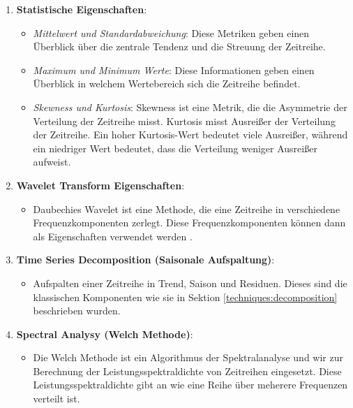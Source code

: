 \begin{enumerate}
    \item \textbf{Statistische Eigenschaften}:
    \begin{itemize}
        \item \textit{Mittelwert und Standardabweichung}: Diese Metriken geben einen Überblick über die zentrale Tendenz und die Streuung der Zeitreihe.
        \item \textit{Maximum und Minimum Werte}: Diese Informationen geben einen Überblick in welchem Wertebereich sich die Zeitreihe befindet.
        \item \textit{Skewness und Kurtosis}: Skewness ist eine Metrik, die die Asymmetrie der Verteilung der Zeitreihe misst. Kurtosis misst Ausreißer der Verteilung der Zeitreihe. 
        Ein hoher Kurtosis-Wert bedeutet viele Ausreißer, während ein niedriger Wert bedeutet, dass die Verteilung weniger Ausreißer aufweist.
    \end{itemize}
    
    \item \textbf{Wavelet Transform Eigenschaften}:
    \begin{itemize} %
        \item Daubechies Wavelet ist eine Methode, die eine Zeitreihe in verschiedene Frequenzkomponenten zerlegt. Diese Frequenzkomponenten können dann als Eigenschaften verwendet werden \cite{szeliski2011computer}.
    \end{itemize}
    
    \item \textbf{Time Series Decomposition (Saisonale Aufspaltung)}:
    \begin{itemize}
        \item Aufspalten einer Zeitreihe in Trend, Saison und Residuen. Dieses sind die klassischen Komponenten wie sie in Sektion \ref*{techniques:decomposition} beschrieben wurden.
    \end{itemize}
    
    \item \textbf{Spectral Analysy (Welch Methode)}:
    \begin{itemize}
        \item Die Welch Methode ist ein Algorithmus der Spektralanalyse und wir zur Berechnung der Leistungsspektraldichte von Zeitreihen eingesetzt. 
        Diese Leistungsspektraldichte gibt an wie eine Reihe über meherere Frequenzen verteilt ist.
    \end{itemize}
\end{enumerate}

